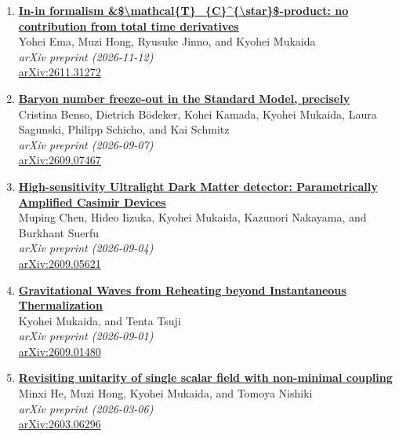 \begin{enumerate}
\item \textbf{\href{https://arxiv.org/abs/2611.31272}{In-in formalism \&\$\textbackslash{}mathcal\{T\}\_\{C\}\textasciicircum{}\{\textbackslash{}star\}\$-product: no contribution from total time derivatives}}\\
Yohei Ema, Muzi Hong, Ryusuke Jinno, and Kyohei Mukaida\\
\emph{arXiv preprint (2026-11-12)}
\\ \href{https://arxiv.org/abs/2611.31272}{arXiv:2611.31272}

\item \textbf{\href{https://arxiv.org/abs/2609.07467}{Baryon number freeze-out in the Standard Model, precisely}}\\
Cristina Benso, Dietrich Bödeker, Kohei Kamada, Kyohei Mukaida, Laura Sagunski, Philipp Schicho, and Kai Schmitz\\
\emph{arXiv preprint (2026-09-07)}
\\ \href{https://arxiv.org/abs/2609.07467}{arXiv:2609.07467}

\item \textbf{\href{https://arxiv.org/abs/2609.05621}{High-sensitivity Ultralight Dark Matter detector: Parametrically Amplified Casimir Devices}}\\
Muping Chen, Hideo Iizuka, Kyohei Mukaida, Kazunori Nakayama, and Burkhant Suerfu\\
\emph{arXiv preprint (2026-09-04)}
\\ \href{https://arxiv.org/abs/2609.05621}{arXiv:2609.05621}

\item \textbf{\href{https://arxiv.org/abs/2609.01480}{Gravitational Waves from Reheating beyond Instantaneous Thermalization}}\\
Kyohei Mukaida, and Tenta Tsuji\\
\emph{arXiv preprint (2026-09-01)}
\\ \href{https://arxiv.org/abs/2609.01480}{arXiv:2609.01480}

\item \textbf{\href{https://arxiv.org/abs/2603.06296}{Revisiting unitarity of single scalar field with non-minimal coupling}}\\
Minxi He, Muzi Hong, Kyohei Mukaida, and Tomoya Nishiki\\
\emph{arXiv preprint (2026-03-06)}
\\ \href{https://arxiv.org/abs/2603.06296}{arXiv:2603.06296}


\end{enumerate}
